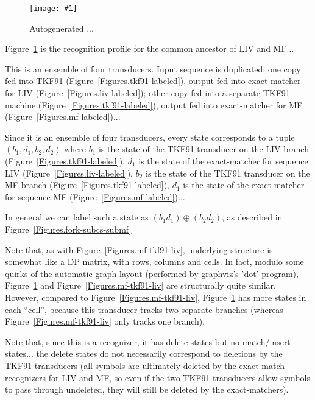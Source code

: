 \documentclass{article}
\newcommand{\figref}[1]{Figure~\ref{Figures.#1}}
\newcommand{\figlabel}[1]{\label{Figures.#1}}
\newcommand{\easyfig}[4]{
\begin{figure}
\texttt{[image: \#1]}
\caption{ \figlabel{#3} #4}
\end{figure}}
\newcommand{\widepdffig}[2]{\easyfig{#1-fig.pdf}{width=\textwidth}{#1}{#2}}
\begin{document}
\widepdffig{fork-tkf91liv-tkf91mf}{ Autogenerated ...}

\figref{fork-tkf91liv-tkf91mf} is the recognition profile for the common ancestor of LIV and MF...

This is an ensemble of four transducers.
Input sequence is duplicated;
one copy fed into TKF91 (\figref{tkf91-labeled}),
output fed into exact-matcher for LIV (\figref{liv-labeled});
other copy fed into a separate TKF91 machine (\figref{tkf91-labeled}),
output fed into exact-matcher for MF (\figref{mf-labeled})...

Since it is an ensemble of four transducers, every state corresponds to a tuple $(b_1,d_1,b_2,d_2)$
where
$b_1$ is the state of the TKF91 transducer on the LIV-branch (\figref{tkf91-labeled}),
$d_1$ is the state of the exact-matcher for sequence LIV (\figref{liv-labeled}),
$b_2$ is the state of the TKF91 transducer on the MF-branch (\figref{tkf91-labeled}),
$d_1$ is the state of the exact-matcher for sequence MF (\figref{mf-labeled})...

In general we can label such a state as $(b_1 d_1) \oplus (b_2 d_2)$,
as described in \figref{fork-subcs-submf}

Note that, as with \figref{mf-tkf91-liv},
underlying structure is somewhat like a DP matrix,
with rows, columns and cells.
In fact, modulo some quirks of the automatic graph layout (performed by graphviz's 'dot' program),
\figref{fork-tkf91liv-tkf91mf} and \figref{mf-tkf91-liv} are structurally quite similar.
However, compared to \figref{mf-tkf91-liv},
\figref{fork-tkf91liv-tkf91mf} has more states in each ``cell'',
because this transducer tracks two separate branches
(whereas \figref{mf-tkf91-liv} only tracks one branch).

Note that, since this is a recognizer, it has delete states but no match/insert states...
the delete states do not necessarily correspond to deletions by the TKF91 transducers
(all symbols are ultimately deleted by the exact-match recognizers for LIV and MF,
so even if the two TKF91 transducers allow symbols to pass through undeleted,
they will still be deleted by the exact-matchers).
\end{document}
